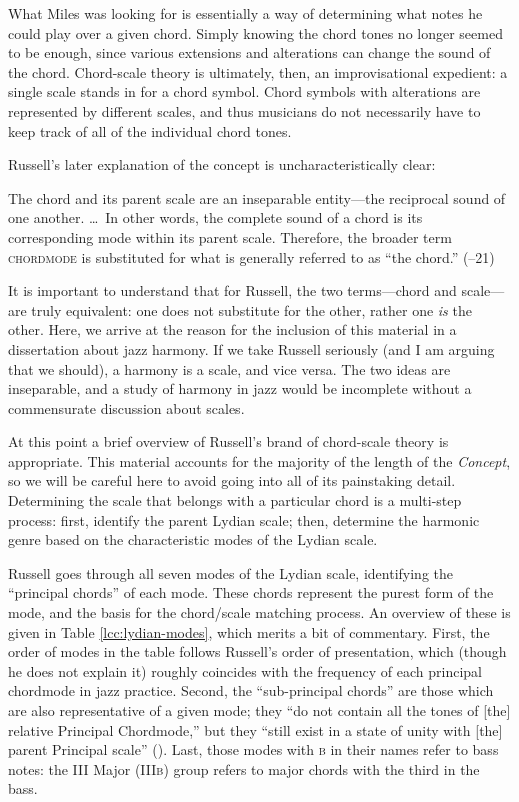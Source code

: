 What Miles was looking for is essentially a way of determining
what notes he could play over a given chord. Simply knowing the chord tones
no longer seemed to be enough, since various extensions and alterations can
change the sound of the chord. Chord-scale theory is ultimately, then, an
improvisational expedient: a single scale stands in for a chord symbol.
Chord symbols with alterations are represented by different scales, and thus
musicians do not necessarily have to keep track of all of the individual chord
tones.

Russell's later explanation of the concept is uncharacteristically clear:%
\begin{quoting}
  \singlespacing \vspace{-0.5em}
  The chord and its parent scale are an inseparable entity---the reciprocal
  sound of one another. \ldots\ In other words, the complete sound of a chord is
  its corresponding mode within its parent scale. Therefore, the broader term
  \textsc{chordmode} is substituted for what is generally referred to as ``the
  chord.'' (--21)
\end{quoting}
%
\noindent It is important to understand that for Russell, the two
terms---chord and scale---are truly equivalent: one does not substitute for
the other, rather one \emph{is} the other. Here, we arrive at the reason for
the inclusion of this material in a dissertation about jazz harmony. If we
take Russell seriously (and I am arguing that we should), a harmony is a scale,
and vice versa. The two ideas are inseparable, and a study of harmony in jazz
would be incomplete without a commensurate discussion about scales.

At this point a brief overview of Russell's brand of chord-scale theory is
appropriate. This material accounts for the majority of the length of the
\emph{Concept}, so we will be careful here to avoid going into all of its
painstaking detail. Determining the scale that belongs with a particular chord
is a multi-step process: first, identify the parent Lydian scale; then,
determine the harmonic genre based on the characteristic modes of the Lydian
scale.

Russell goes through all seven modes of the Lydian scale, identifying the
``principal chords'' of each mode. These chords represent the purest form of
the mode, and the basis for the chord/scale matching process. An overview of
these is given in Table \ref{lcc:lydian-modes}, which merits a bit of
commentary. First, the order of modes in the table follows
Russell's order of presentation, which (though he does not explain it)
roughly coincides with the frequency of each principal chordmode in jazz practice.
Second, the ``sub-principal chords'' are those which are also representative
of a given mode; they ``do not contain all the tones of [the] relative
Principal Chordmode,'' but they ``still exist in a state of unity with [the]
parent Principal scale'' (). Last, those modes with \textsc{b} in their
names refer to bass notes: the III Major (III\textsc{b}) group refers to major
chords with the third in the bass.

